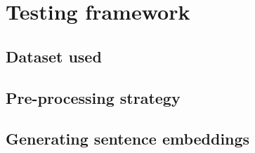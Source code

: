 \chapter{Testing framework}
\section{Dataset used}
\section{Pre-processing strategy}
\section{Generating sentence embeddings}